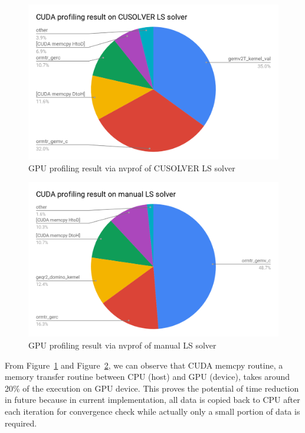\documentclass[English]{dicomopapers}
\begin{document}
\begin{figure}[ht]
  \centering
  \includegraphics[width=\textwidth/3,natwidth=1200,natheight=742]{nvprof_qr.png}
  \caption{GPU profiling result via nvprof of CUSOLVER LS solver}\label{fig:nvprof_qr}
\end{figure}

\begin{figure}[ht]
  \centering
  \includegraphics[width=\textwidth/3,natwidth=1200,natheight=742]{nvprof_manual.png}
  \caption{GPU profiling result via nvprof of manual LS solver}\label{fig:nvprof_manual}
\end{figure}
From Figure~\ref{fig:nvprof_qr} and Figure~\ref{fig:nvprof_manual}, we can observe that CUDA memcpy routine, a memory transfer routine between CPU (host) and GPU (device), takes around 20\% of the execution on GPU device. This proves the potential of time reduction in future because in current implementation, all data is copied back to CPU after each iteration for convergence check while actually only a small portion of data is required.\newline
\end{document}
